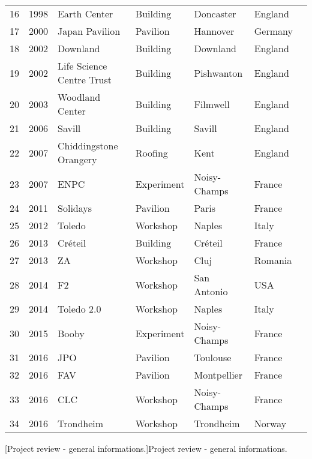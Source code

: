 \begin{table}[p]
\begin{fullpage}
\begin{tabularx}{\textwidth}{@{}llXlllr@{}}
16 & 1998 & Earth Center & Building & Doncaster & England & \\
17 & 2000 & Japan Pavilion & Pavilion & Hannover & Germany & \cite{Ban2006}\\
18 & 2002 & Downland & Building & Downland & England & \cite{Harris2003}\\
19 & 2002 & Life Science Centre Trust & Building & Pishwanton & England & \\
20 & 2003 & Woodland Center & Building & Filmwell & England & \\
21 & 2006 & Savill & Building & Savill & England & \cite{Harris2008}\\
22 & 2007 & Chiddingstone Orangery & Roofing & Kent & England & \\
23 & 2007 & ENPC & Experiment & Noisy-Champs & France & \cite{Douthe2006}\\
24 & 2011 & Solidays & Pavilion & Paris & France & \cite{Baverel2012}\\
25 & 2012 & Toledo & Workshop & Naples & Italy & \cite{DAmico2014}\\
26 & 2013 & Créteil & Building & Créteil & France & \cite{DuPeloux2016}\\
27 & 2013 & ZA & Workshop & Cluj & Romania & \\
28 & 2014 & F2 & Workshop & San Antonio & USA & \\
29 & 2014 & Toledo 2.0 & Workshop & Naples & Italy & \cite{DAmico2015a}\\
30 & 2015 & Booby & Experiment & Noisy-Champs & France & \cite{Cuvilliers2017}\\
31 & 2016 & JPO & Pavilion & Toulouse & France & \\
32 & 2016 & FAV & Pavilion & Montpellier & France & \\
33 & 2016 & CLC & Workshop & Noisy-Champs & France & \\
34 & 2016 & Trondheim & Workshop & Trondheim & Norway & \cite{Mork2016}\\
\bottomrule
 	\end{tabularx}
[Project review - general informations.]{Project review - general informations.}
\end{fullpage}
\end{table}

